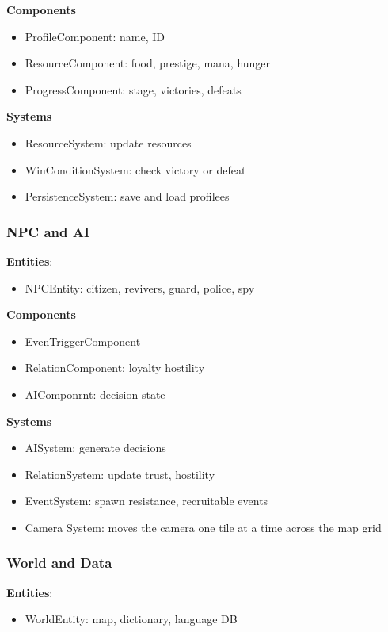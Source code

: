 \documentclass[11pt]{article}
\begin{document}
\textbf{Components}
\begin{itemize}
\item
  ProfileComponent: name, ID
\item
  ResourceComponent: food, prestige, mana, hunger
\item
  ProgressComponent: stage, victories, defeats
\end{itemize}

\textbf{Systems}
\begin{itemize}
\item
  ResourceSystem: update resources
\item
  WinConditionSystem: check victory or defeat
\item
  PersistenceSystem: save and load profilees
\end{itemize}

\subsubsection{NPC and AI}
\textbf{Entities}:
\begin{itemize}
\item
  NPCEntity: citizen, revivers, guard, police, spy
\end{itemize}

\textbf{Components}
\begin{itemize}
\item
  EvenTriggerComponent
\item
  RelationComponent: loyalty hostility
\item
  AIComponrnt: decision state
\end{itemize}

\textbf{Systems}
\begin{itemize}
\item
  AISystem: generate decisions
\item
  RelationSystem: update trust, hostility
\item
  EventSystem: spawn resistance, recruitable events
\item
  Camera System: moves the camera one tile at a time across the map grid
\end{itemize}

\subsubsection{World and Data}
\textbf{Entities}:
\begin{itemize}
\item
  WorldEntity: map, dictionary, language DB
\end{itemize}
\end{document}
